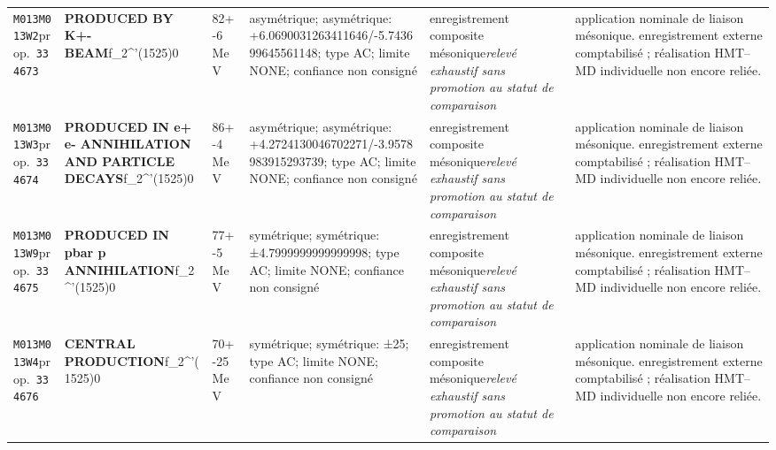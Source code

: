 \begin{landscape}
\begin{longtable}{L{1.85cm}L{4.45cm}L{2.35cm}L{4.05cm}L{3.35cm}L{7.15cm}}
\texttt{M013}\newline \texttt{M013W2}\newline prop.\ \texttt{334673} & \textbf{PRODUCED BY K+- BEAM}\newline f\_\allowbreak{}2\textasciicircum{}'(1525)0 & 82+-6\,MeV & asymétrique; asymétrique: +6.0690031263411646/-5.743699645561148; type AC; limite NONE; confiance non consigné & enregistrement composite mésonique\newline \emph{relevé exhaustif sans promotion au statut de comparaison} & application nominale de liaison mésonique. enregistrement externe comptabilisé ; réalisation HMT--MD individuelle non encore reliée. \\
\texttt{M013}\newline \texttt{M013W3}\newline prop.\ \texttt{334674} & \textbf{PRODUCED IN e+ e- ANNIHILATION AND PARTICLE DECAYS}\newline f\_\allowbreak{}2\textasciicircum{}'(1525)0 & 86+-4\,MeV & asymétrique; asymétrique: +4.2724130046702271/-3.9578983915293739; type AC; limite NONE; confiance non consigné & enregistrement composite mésonique\newline \emph{relevé exhaustif sans promotion au statut de comparaison} & application nominale de liaison mésonique. enregistrement externe comptabilisé ; réalisation HMT--MD individuelle non encore reliée. \\
\texttt{M013}\newline \texttt{M013W9}\newline prop.\ \texttt{334675} & \textbf{PRODUCED IN pbar p ANNIHILATION}\newline f\_\allowbreak{}2\textasciicircum{}'(1525)0 & 77+-5\,MeV & symétrique; symétrique: ±4.7999999999999998; type AC; limite NONE; confiance non consigné & enregistrement composite mésonique\newline \emph{relevé exhaustif sans promotion au statut de comparaison} & application nominale de liaison mésonique. enregistrement externe comptabilisé ; réalisation HMT--MD individuelle non encore reliée. \\
\texttt{M013}\newline \texttt{M013W4}\newline prop.\ \texttt{334676} & \textbf{CENTRAL PRODUCTION}\newline f\_\allowbreak{}2\textasciicircum{}'(1525)0 & 70+-25\,MeV & symétrique; symétrique: ±25; type AC; limite NONE; confiance non consigné & enregistrement composite mésonique\newline \emph{relevé exhaustif sans promotion au statut de comparaison} & application nominale de liaison mésonique. enregistrement externe comptabilisé ; réalisation HMT--MD individuelle non encore reliée. \\

\end{longtable}
\end{landscape}
